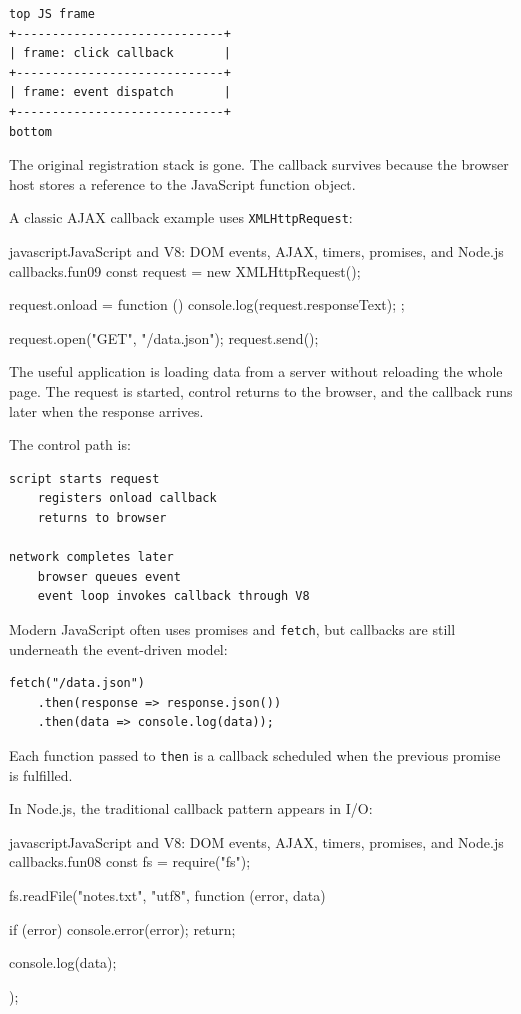 \documentclass[a4paper,twoside]{report}
\begin{document}
\begin{verbatim}
top JS frame
+-----------------------------+
| frame: click callback       |
+-----------------------------+
| frame: event dispatch       |
+-----------------------------+
bottom
\end{verbatim}

The original registration stack is gone. The callback survives because the browser host stores a reference to the JavaScript function object.

A classic AJAX callback example uses \texttt{XMLHttpRequest}:

\begin{codebox}[]{javascript}{JavaScript and V8: DOM events, AJAX, timers, promises, and Node.js callbacks.}{fun09}
const request = new XMLHttpRequest();

request.onload = function () {
    console.log(request.responseText);
};

request.open("GET", "/data.json");
request.send();
\end{codebox}


The useful application is loading data from a server without reloading the whole page. The request is started, control returns to the browser, and the callback runs later when the response arrives.

The control path is:

\begin{verbatim}
script starts request
    registers onload callback
    returns to browser

network completes later
    browser queues event
    event loop invokes callback through V8
\end{verbatim}

Modern JavaScript often uses promises and \texttt{fetch}, but callbacks are still underneath the event-driven model:

\begin{verbatim}
fetch("/data.json")
    .then(response => response.json())
    .then(data => console.log(data));
\end{verbatim}

Each function passed to \texttt{then} is a callback scheduled when the previous promise is fulfilled.

In Node.js, the traditional callback pattern appears in I/O:

\begin{codebox}[]{javascript}{JavaScript and V8: DOM events, AJAX, timers, promises, and Node.js callbacks.}{fun08}
const fs = require("fs");

fs.readFile("notes.txt", "utf8", function (error, data) {
    if (error) {
        console.error(error);
        return;
    }

    console.log(data);
});
\end{codebox}
\end{document}
